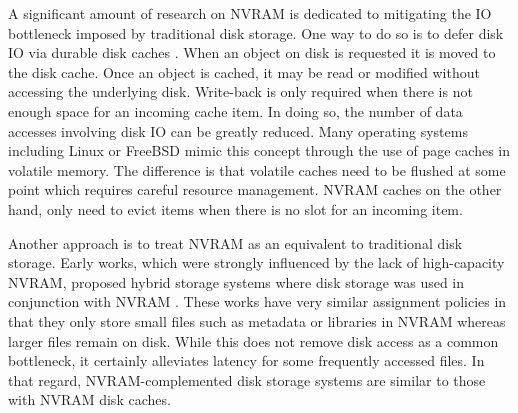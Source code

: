 A significant amount of research on NVRAM is dedicated to mitigating the IO
bottleneck imposed by traditional disk storage. One way to do so is to defer
disk IO via durable disk caches \cite{chen1996rio, wu1994envy}. When an object
on disk is requested it is moved to the disk cache. Once an object is cached, it
may be read or modified without accessing the underlying disk. Write-back is
only required when there is not enough space for an incoming cache item. In
doing so, the number of data accesses involving disk IO can be greatly reduced.
Many operating systems including Linux or FreeBSD mimic this concept through the
use of page caches in volatile memory. The difference is that volatile caches
need to be flushed at some point which requires careful resource management.
NVRAM caches on the other hand, only need to evict items when there is no slot
for an incoming item.

Another approach is to treat NVRAM as an equivalent to traditional disk storage.
Early works, which were strongly influenced by the lack of high-capacity NVRAM,
proposed hybrid storage systems where disk storage was used in conjunction with
NVRAM \cite{wang2002conquest, miller2001hermes}. These works have very similar
assignment policies in that they only store small files such as metadata or
libraries in NVRAM whereas larger files remain on disk. While this does not
remove disk access as a common bottleneck, it certainly alleviates latency for
some frequently accessed files. In that regard, NVRAM-complemented disk storage
systems are similar to those with NVRAM disk caches.

